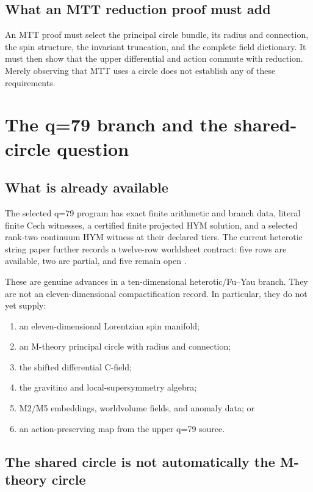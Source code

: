 \documentclass[11pt]{article}
\theoremstyle{definition}
\theoremstyle{remark}
\begin{document}
\subsection{What an MTT reduction proof must add}

An MTT proof must select the principal circle bundle, its radius and
connection, the spin structure, the invariant truncation, and the complete
field dictionary.  It must then show that the upper differential and action
commute with reduction.  Merely observing that MTT uses a circle does not
establish any of these requirements.

\section{The q=79 branch and the shared-circle question}
\label{sec:q79}

\subsection{What is already available}

The selected q=79 program has exact finite arithmetic and branch data,
literal finite Cech witnesses, a certified finite projected HYM solution,
and a selected rank-two continuum HYM witness at their declared tiers.  The
current heterotic string paper further records a twelve-row worldsheet
contract: five rows are available, two are partial, and five remain open
\cite{NeroString2026,NeroStrominger2026,NeroFluxAudit2026}.

These are genuine advances in a ten-dimensional heterotic/Fu--Yau branch.
They are not an eleven-dimensional compactification record.  In particular,
they do not yet supply:
\begin{enumerate}[leftmargin=1.7em]
\item an eleven-dimensional Lorentzian spin manifold;
\item an M-theory principal circle with radius and connection;
\item the shifted differential C-field;
\item the gravitino and local-supersymmetry algebra;
\item M2/M5 embeddings, worldvolume fields, and anomaly data; or
\item an action-preserving map from the upper q=79 source.
\end{enumerate}

\subsection{The shared circle is not automatically the M-theory circle}
\end{document}
